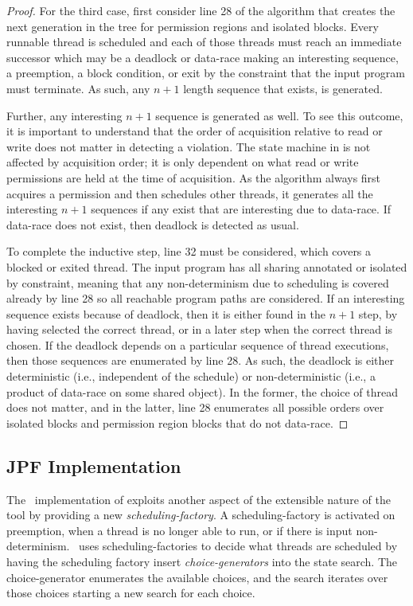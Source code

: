 \begin{proof}
For the third case, first consider line 28 of the algorithm that creates
the next generation in the tree for permission regions and isolated
blocks. Every runnable thread is scheduled and each of those threads
must reach an immediate successor which may be a deadlock or data-race making an interesting sequence, a preemption, a
block condition, or exit by the constraint that the input program must
terminate. As such, any $n+1$ length sequence that exists, is
generated.

Further, any interesting $n+1$ sequence is generated as well. To see
this outcome, it is important to understand that the order of
acquisition relative to read or write does not matter in detecting a
violation. The state machine in  is not
affected by acquisition order; it is only dependent on what read or write
permissions are held at the time of acquisition. As the algorithm always first acquires a
permission and then schedules other threads, it generates all the
interesting $n+1$ sequences if any exist that are interesting due to data-race. If data-race does not exist, then deadlock is detected as usual.

To complete the inductive step, line 32 must be considered, which covers
a blocked or exited thread. The input program has all sharing
annotated or isolated by constraint, meaning that any non-determinism
due to scheduling is covered already by line 28 so all reachable
program paths are considered. If an interesting sequence exists
because of deadlock, then it is either found in the $n+1$ step, by
having selected the correct thread, or in a later step when the
correct thread is chosen. If the deadlock depends on a particular sequence of
thread executions, then those sequences are enumerated by line 28. As
such, the deadlock is either deterministic (i.e., independent of the
schedule) or non-deterministic (i.e., a product of data-race on some
shared object). In the former, the choice of thread does not matter,
and in the latter, line 28 enumerates all possible orders over
isolated blocks and permission region blocks that do not data-race.
\end{proof}

\subsection{JPF Implementation}
The \jpf\ implementation of  exploits another aspect
of the extensible nature of the tool by providing a new
\emph{scheduling-factory}.  A scheduling-factory is activated on
preemption, when a thread is no longer able to run, or if there is
input non-determinism.  \jpf\ uses scheduling-factories to decide what
threads are scheduled by having the scheduling factory insert
\emph{choice-generators} into the state search. The choice-generator
enumerates the available choices, and the search iterates over those
choices starting a new search for each choice.

